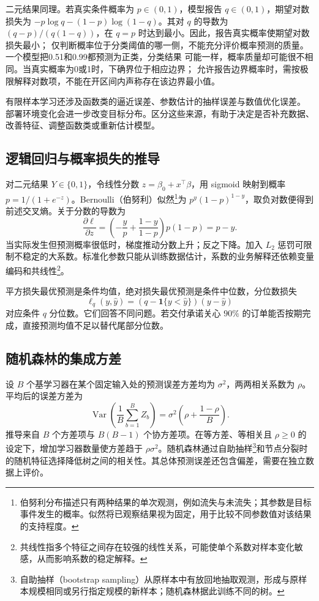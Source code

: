 二元结果同理。若真实条件概率为 \(p\in(0,1)\)，模型报告 \(q\in(0,1)\)，期望对数损失为
\(-p\log q-(1-p)\log(1-q)\)。其对 \(q\) 的导数为
\((q-p)/(q(1-q))\)，在 \(q=p\) 时达到最小。因此，报告真实概率使期望对数损失最小；
仅判断概率位于分类阈值的哪一侧，不能充分评价概率预测的质量。一个模型把0.51和0.99都预测为正类，分类结果
可能一样，概率质量却可能很不相同。当真实概率为0或1时，下确界位于相应边界；
允许报告边界概率时，需按极限解释对数项，不能在开区间内声称存在该边界最小值。

有限样本学习还涉及函数类的逼近误差、参数估计的抽样误差与数值优化误差。
部署环境变化会进一步改变目标分布。区分这些来源，有助于决定是否补充数据、
改善特征、调整函数类或重新估计模型\cite{hastie2009,james2021}。

\subsection{逻辑回归与概率损失的推导}
对二元结果 \(Y\in\{0,1\}\)，令线性分数 \(z=\beta_0+x^\top\beta\)，用 sigmoid 映射到概率 \(p=1/(1+e^{-z})\)。Bernoulli（伯努利）似然\footnote{伯努利分布描述只有两种结果的单次观测，例如流失与未流失；其参数是目标事件发生的概率。似然将已观察结果视为固定，用于比较不同参数值对该结果的支持程度。}为 \(p^y(1-p)^{1-y}\)，取负对数便得到前述交叉熵。关于分数的导数为
\[
\frac{\partial\ell}{\partial z}
=\left(-\frac yp+\frac{1-y}{1-p}\right)p(1-p)=p-y.
\]
当实际发生但预测概率很低时，梯度推动分数上升；反之下降。加入 \(L_2\) 惩罚可限制不稳定的大系数。标准化参数只能从训练数据估计，系数的业务解释还依赖变量编码和共线性\footnote{共线性指多个特征之间存在较强的线性关系，可能使单个系数对样本变化敏感，从而影响系数的稳定解释。}。

平方损失最优预测是条件均值，绝对损失最优预测是条件中位数，分位数损失
\[
\ell_q(y,\hat y)=(q-\mathbf1\{y<\hat y\})(y-\hat y)
\]
对应条件 \(q\) 分位数。它们回答不同问题。若交付承诺关心 \(90\%\) 的订单能否按期完成，直接预测均值不足以替代尾部分位数。

\subsection{随机森林的集成方差}
设 \(B\) 个基学习器在某个固定输入处的预测误差方差均为 \(\sigma^2\)，两两相关系数为 \(\rho\)。平均后的误差方差为
\[
\operatorname{Var}\!\left(\frac1B\sum_{b=1}^B Z_b\right)
=\sigma^2\left(\rho+\frac{1-\rho}{B}\right).
\]
推导来自 \(B\) 个方差项与 \(B(B-1)\) 个协方差项。在等方差、等相关且 \(\rho\ge0\) 的设定下，增加学习器数量使方差趋于 \(\rho\sigma^2\)。随机森林通过自助抽样\footnote{自助抽样（bootstrap sampling）从原样本中有放回地抽取观测，形成与原样本规模相同或另行指定规模的新样本；随机森林据此训练不同的树。}和节点分裂时的随机特征选择降低树之间的相关性。其总体预测误差还包含偏差，需要在独立数据上评价。

